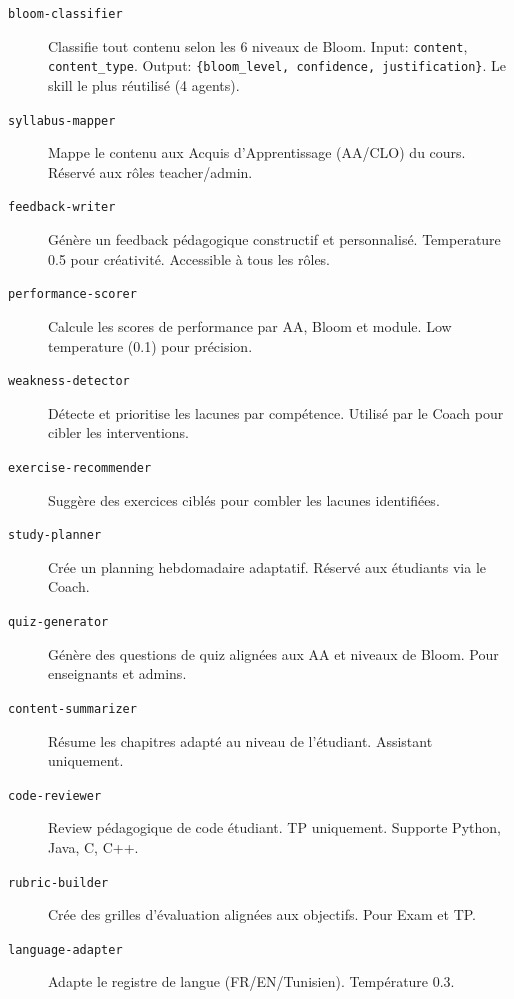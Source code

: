 \documentclass[12pt,a4paper]{article}
\begin{document}
\begin{description}
  \item[\texttt{bloom-classifier}] Classifie tout contenu selon les 6 niveaux de Bloom. Input: \texttt{content}, \texttt{content\_type}. Output: \texttt{\{bloom\_level, confidence, justification\}}. Le skill le plus réutilisé (4 agents).

  \item[\texttt{syllabus-mapper}] Mappe le contenu aux Acquis d'Apprentissage (AA/CLO) du cours. Réservé aux rôles teacher/admin.

  \item[\texttt{feedback-writer}] Génère un feedback pédagogique constructif et personnalisé. Temperature 0.5 pour créativité. Accessible à tous les rôles.

  \item[\texttt{performance-scorer}] Calcule les scores de performance par AA, Bloom et module. Low temperature (0.1) pour précision.

  \item[\texttt{weakness-detector}] Détecte et prioritise les lacunes par compétence. Utilisé par le Coach pour cibler les interventions.

  \item[\texttt{exercise-recommender}] Suggère des exercices ciblés pour combler les lacunes identifiées.

  \item[\texttt{study-planner}] Crée un planning hebdomadaire adaptatif. Réservé aux étudiants via le Coach.

  \item[\texttt{quiz-generator}] Génère des questions de quiz alignées aux AA et niveaux de Bloom. Pour enseignants et admins.

  \item[\texttt{content-summarizer}] Résume les chapitres adapté au niveau de l'étudiant. Assistant uniquement.

  \item[\texttt{code-reviewer}] Review pédagogique de code étudiant. TP uniquement. Supporte Python, Java, C, C++.

  \item[\texttt{rubric-builder}] Crée des grilles d'évaluation alignées aux objectifs. Pour Exam et TP.

  \item[\texttt{language-adapter}] Adapte le registre de langue (FR/EN/Tunisien). Température 0.3.
\end{description}
\end{document}
